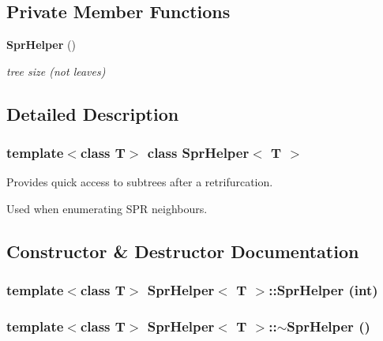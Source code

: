 \subsection*{Private Member Functions}
\begin{CompactItemize}
\item 
{\bf Spr\-Helper} ()
\begin{CompactList}\small\item\em tree size (not leaves) \item\end{CompactList}\end{CompactItemize}


\subsection{Detailed Description}
\subsubsection*{template$<$class T$>$ class Spr\-Helper$<$ T $>$}

Provides quick access to subtrees after a retrifurcation. 

Used when enumerating SPR neighbours. 



\subsection{Constructor \& Destructor Documentation}
\subsubsection{\setlength{\rightskip}{0pt plus 5cm}template$<$class T$>$ {\bf Spr\-Helper}$<$ T $>$::{\bf Spr\-Helper} (int)}\label{classSprHelper_a0}


\subsubsection{\setlength{\rightskip}{0pt plus 5cm}template$<$class T$>$ {\bf Spr\-Helper}$<$ T $>$::$\sim${\bf Spr\-Helper} ()}\label{classSprHelper_a1}


